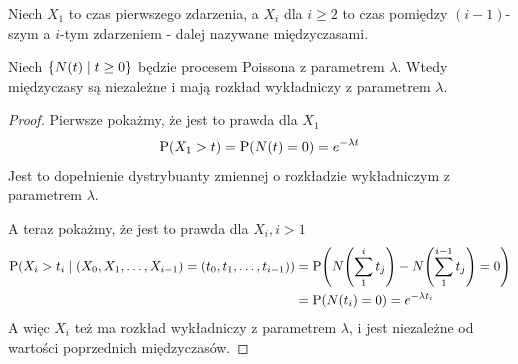 Niech \(X_1\) to czas pierwszego zdarzenia, a \(X_i\) dla \(i \geq 2\) to czas pomiędzy \((i-1)\)-szym a \(i\)-tym zdarzeniem - dalej nazywane międzyczasami.

\begin{theorem}[Twierdzenia 8.9 i 8.10 P\&C]
	Niech \(\set{N(t) \mid t \geq 0}\) będzie procesem Poissona z parametrem \(\lambda\). Wtedy międzyczasy są niezależne i mają rozkład wykładniczy z parametrem \(\lambda\).
\end{theorem}
\begin{proof} Pierwsze pokażmy, że jest to prawda dla \(X_1\)
	\begin{align*}
		\prob\pars{X_1 > t} = \prob\pars{N(t) = 0} = e^{-\lambda t}
	\end{align*}
	Jest to dopełnienie dystrybuanty zmiennej o rozkładzie wykładniczym z parametrem \(\lambda\).

	A teraz pokażmy, że jest to prawda dla \(X_i, i > 1\)
	\begin{align*}
		\prob\pars{X_i > t_i \mid (X_0, X_1, \dots, X_{i-1}) = (t_0, t_1, \dots, t_{i-1})} & = \prob\pars{N\pars{\sum_1^i t_j} - N\pars{\sum_1^{i-1} t_j} = 0} \\
		                                                                                   & = \prob\pars{N(t_i) = 0} = e^{-\lambda t_i}
	\end{align*}
	A więc \(X_i\) też ma rozkład wykładniczy z parametrem \(\lambda\), i jest niezależne od wartości poprzednich międzyczasów.
\end{proof}

